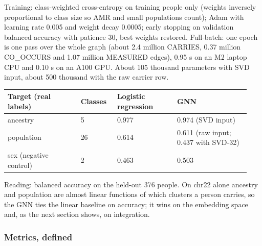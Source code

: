 \documentclass[11pt,a4paper]{article}
\begin{document}
Training: class-weighted cross-entropy on training people only (weights inversely proportional to class size so AMR and small populations count); Adam with learning rate 0.005 and weight decay 0.0005; early stopping on validation balanced accuracy with patience 30, best weights restored. Full-batch: one epoch is one pass over the whole graph (about 2.4 million CARRIES, 0.37 million CO\_OCCURS and 1.07 million MEASURED edges), 0.95 s on an M2 laptop CPU and 0.10 s on an A100 GPU. About 105 thousand parameters with SVD input, about 500 thousand with the raw carrier row.

\begin{longtable}{p{0.282\linewidth}p{0.141\linewidth}p{0.235\linewidth}p{0.282\linewidth}}
\toprule
\textbf{Target (real labels)} & \textbf{Classes} & \textbf{Logistic regression} & \textbf{GNN} \\
\midrule
\endhead
ancestry & 5 & 0.977 & 0.974 (SVD input) \\
population & 26 & 0.614 & 0.611 (raw input; 0.437 with SVD-32) \\
sex (negative control) & 2 & 0.463 & 0.503 \\
\bottomrule
\end{longtable}

Reading: balanced accuracy on the held-out 376 people. On chr22 alone ancestry and population are almost linear functions of which clusters a person carries, so the GNN ties the linear baseline on accuracy; it wins on the embedding space and, as the next section shows, on integration.

\subsubsection{Metrics, defined}
\end{document}
